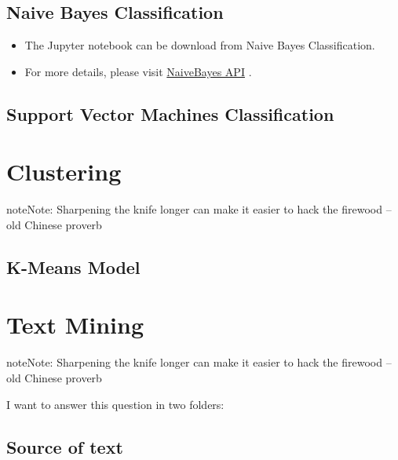 \documentclass[letterpaper,11pt,english]{sphinxmanual}
\begin{document}
\section{Naive Bayes Classification}
\label{classification:naive-bayes-classification}\begin{itemize}
\item {} 
The Jupyter notebook can be download from Naive Bayes Classification.

\item {} 
For more details, please visit \href{http://takwatanabe.me/pyspark/generated/generated/ml.classification.NaiveBayes.html}{NaiveBayes API} .

\end{itemize}


\section{Support Vector Machines Classification}
\label{classification:support-vector-machines-classification}

\chapter{Clustering}
\label{clustering:naivebayes-api}\label{clustering:clustering}\label{clustering::doc}\label{clustering:id1}
\begin{notice}{note}{Note:}
Sharpening the knife longer can make it easier to hack the firewood -- old Chinese proverb
\end{notice}


\section{K-Means Model}
\label{clustering:k-means-model}

\chapter{Text Mining}
\label{textmining:yassine-alouini}\label{textmining:text-mining}\label{textmining::doc}\label{textmining:textmining}
\begin{notice}{note}{Note:}
Sharpening the knife longer can make it easier to hack the firewood -- old Chinese proverb
\end{notice}

I want to answer this question in two folders:


\section{Source of text}
\label{textmining:source-of-text}
\end{document}
